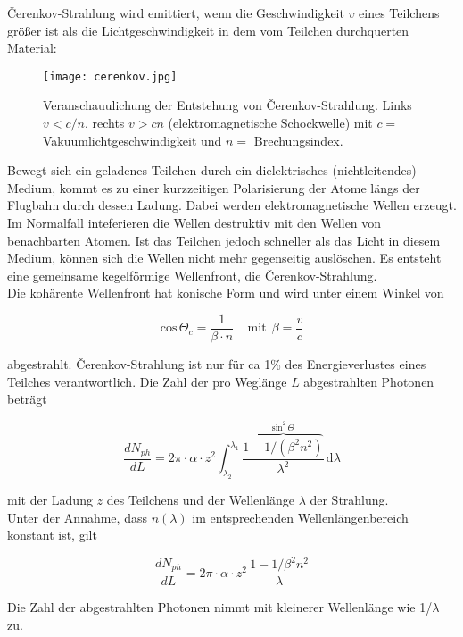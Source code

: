 \v{C}erenkov-Strahlung wird emittiert, wenn die Geschwindigkeit $v$ eines Teilchens größer ist als
die Lichtgeschwindigkeit in dem vom Teilchen durchquerten Material:

\begin{figure}[H]
	\centering
	\texttt{[image: cerenkov.jpg]}
	\caption{Veranschauulichung der Entstehung von \v{C}erenkov-Strahlung. Links $v<c/n$, rechts $v>cn$
	(elektromagnetische Schockwelle) mit $c=$ Vakuumlichtgeschwindigkeit und $n=$ Brechungsindex. }
\end{figure}

Bewegt sich ein geladenes Teilchen durch ein dielektrisches (nichtleitendes) Medium, kommt es zu
einer kurzzeitigen Polarisierung der Atome längs der Flugbahn durch dessen Ladung. Dabei werden
elektromagnetische Wellen erzeugt. Im Normalfall inteferieren die Wellen destruktiv mit den Wellen
von benachbarten Atomen. Ist das Teilchen jedoch schneller als das Licht in diesem Medium, können
sich die Wellen nicht mehr gegenseitig auslöschen. Es entsteht eine gemeinsame kegelförmige
Wellenfront, die \v{C}erenkov-Strahlung.
\\
Die kohärente Wellenfront hat konische Form und wird unter einem Winkel von 

\[\text{cos}\,\Theta_c=\frac{1}{\beta\cdot n}~~~~~\text{mit}~~\beta=\frac{v}{c}\]

abgestrahlt. \v{C}erenkov-Strahlung ist nur für ca 1\% des Energieverlustes eines Teilches
verantwortlich. Die Zahl der pro Weglänge $L$ abgestrahlten Photonen beträgt

\[\frac{dN_{ph}}{dL}= 2\pi\cdot\alpha\cdot z^2 \int_{\lambda_2}^{\lambda_1}
\frac{\overbrace{1-1/(\beta^2n^2)}^{\text{sin}^2\,\Theta}}{\lambda^2}\,\mathrm{d}\lambda\]

mit der Ladung $z$ des Teilchens und der Wellenlänge $\lambda$ der Strahlung. 
\\
Unter der Annahme, dass $n(\lambda)$ im entsprechenden Wellenlängenbereich konstant ist, gilt

\[\frac{dN_{ph}}{dL}= 2\pi\cdot\alpha\cdot z^2 \, \frac{1-1/\beta^2n^2}{\lambda}\]

Die Zahl der abgestrahlten Photonen nimmt mit kleinerer Wellenlänge wie 1/$\lambda$ zu.